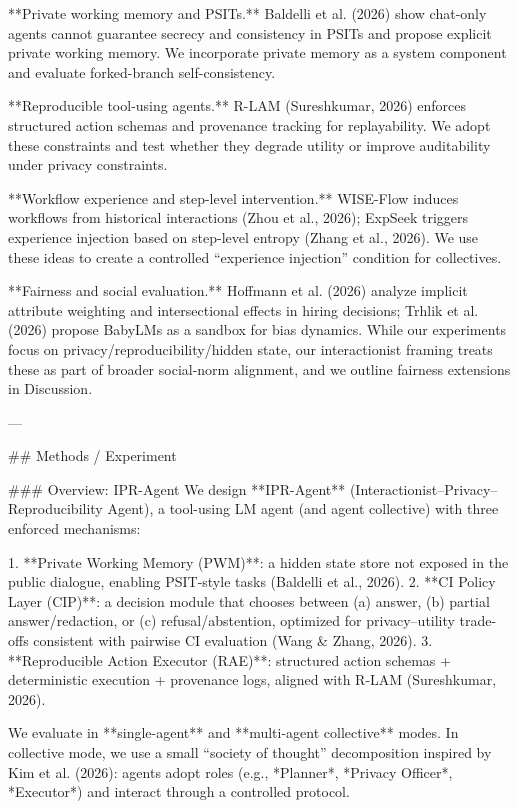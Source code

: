 **Private working memory and PSITs.** Baldelli et al. (2026) show chat-only agents cannot guarantee secrecy and consistency in PSITs and propose explicit private working memory. We incorporate private memory as a system component and evaluate forked-branch self-consistency.

**Reproducible tool-using agents.** R-LAM (Sureshkumar, 2026) enforces structured action schemas and provenance tracking for replayability. We adopt these constraints and test whether they degrade utility or improve auditability under privacy constraints.

**Workflow experience and step-level intervention.** WISE-Flow induces workflows from historical interactions (Zhou et al., 2026); ExpSeek triggers experience injection based on step-level entropy (Zhang et al., 2026). We use these ideas to create a controlled “experience injection” condition for collectives.

**Fairness and social evaluation.** Hoffmann et al. (2026) analyze implicit attribute weighting and intersectional effects in hiring decisions; Trhlik et al. (2026) propose BabyLMs as a sandbox for bias dynamics. While our experiments focus on privacy/reproducibility/hidden state, our interactionist framing treats these as part of broader social-norm alignment, and we outline fairness extensions in Discussion.

---

## Methods / Experiment  

### Overview: IPR-Agent  
We design **IPR-Agent** (Interactionist–Privacy–Reproducibility Agent), a tool-using LM agent (and agent collective) with three enforced mechanisms:

1. **Private Working Memory (PWM)**: a hidden state store not exposed in the public dialogue, enabling PSIT-style tasks (Baldelli et al., 2026).  
2. **CI Policy Layer (CIP)**: a decision module that chooses between (a) answer, (b) partial answer/redaction, or (c) refusal/abstention, optimized for privacy–utility trade-offs consistent with pairwise CI evaluation (Wang & Zhang, 2026).  
3. **Reproducible Action Executor (RAE)**: structured action schemas + deterministic execution + provenance logs, aligned with R-LAM (Sureshkumar, 2026).

We evaluate in **single-agent** and **multi-agent collective** modes. In collective mode, we use a small “society of thought” decomposition inspired by Kim et al. (2026): agents adopt roles (e.g., *Planner*, *Privacy Officer*, *Executor*) and interact through a controlled protocol.


